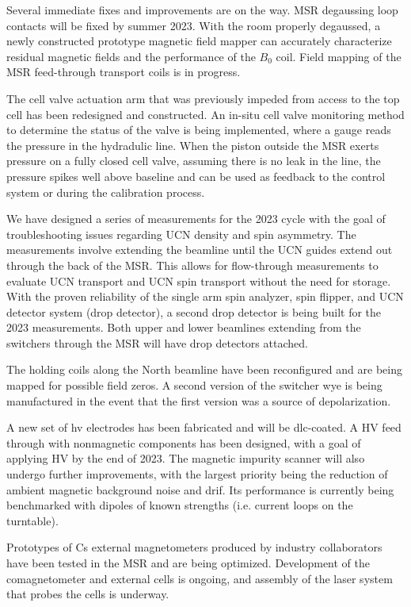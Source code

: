 Several immediate fixes and improvements are on the way. MSR degaussing loop contacts will be fixed by summer 2023. With the room properly degaussed, a newly constructed prototype magnetic field mapper can accurately characterize residual magnetic fields and the performance of the $B_0$ coil. Field mapping of the MSR feed-through transport coils is in progress. 

The cell valve actuation arm that was previously impeded from access to the top cell has been redesigned and constructed. An in-situ cell valve monitoring method to determine the status of the valve is being implemented, where a gauge reads the pressure in the hydradulic line. When the piston outside the MSR exerts pressure on a fully closed cell valve, assuming there is no leak in the line, the pressure spikes well above baseline and can be used as feedback to the control system or during the calibration process.

We have designed a series of measurements for the 2023 cycle with the goal of troubleshooting issues regarding UCN density and spin asymmetry. The measurements involve extending the beamline until the UCN guides extend out through the back of the MSR. This allows for flow-through measurements to evaluate UCN transport and UCN spin transport without the need for storage. With the proven reliability of the single arm spin analyzer, spin flipper, and UCN detector system (drop detector), a second drop detector is being built for the 2023 measurements. Both upper and lower beamlines extending from the switchers through the MSR will have drop detectors attached. 

The holding coils along the North beamline have been reconfigured and are being mapped for possible field zeros. A second version of the switcher wye is being manufactured in the event that the first version was a source of depolarization.

A new set of \acrshort{hv} electrodes has been fabricated and will be \acrshort{dlc}-coated. A HV feed through with nonmagnetic components has been designed, with a goal of applying HV by the end of 2023. The magnetic impurity scanner will also undergo further improvements, with the largest priority being the reduction of ambient magnetic background noise and drif. Its performance is currently being benchmarked with dipoles of known strengths (i.e. current loops on the turntable).

Prototypes of Cs external magnetometers produced by industry collaborators have been tested in the MSR and are being optimized. Development of the \hg comagnetometer and external \hg cells is ongoing, and assembly of the laser system that probes the \hg cells is underway.
